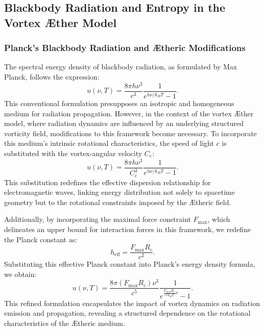 
\subsection{Blackbody Radiation and Entropy in the Vortex \AE{}ther Model}


\subsubsection*{Planck's Blackbody Radiation and \AE{}theric Modifications}
The spectral energy density of blackbody radiation, as formulated by Max Planck, follows the expression:
\begin{equation*}
u(\nu, T) = \frac{8 \pi h \nu^3}{c^3} \frac{1}{e^{h \nu / k_B T} - 1}.
\end{equation*}
This conventional formulation presupposes an isotropic and homogeneous medium for radiation propagation. However, in the context of the vortex \AE{}ther model, where radiation dynamics are influenced by an underlying structured vorticity field, modifications to this framework become necessary. To incorporate this medium’s intrinsic rotational characteristics, the speed of light $c$ is substituted with the vortex-angular velocity $C_e$:
\begin{equation*}
u(\nu, T) = \frac{8 \pi h \nu^3}{C_e^3} \frac{1}{e^{h \nu / k_B T} - 1}.
\end{equation*}
This substitution redefines the effective dispersion relationship for electromagnetic waves, linking energy distribution not solely to spacetime geometry but to the rotational constraints imposed by the \AE{}theric field.


Additionally, by incorporating the maximal force constraint $F_{\max}$, which delineates an upper bound for interaction forces in this framework, we redefine the Planck constant as:
\begin{equation*}
h_\text{eff} = \frac{F_{\max} R_c}{c^2}.
\end{equation*}
Substituting this effective Planck constant into Planck’s energy density formula, we obtain:
\begin{equation*}
u(\nu, T) = \frac{8 \pi \left( F_{\max} R_c \right) \nu^3}{c^5} \frac{1}{e^{\frac{F_{\max} R_c}{c^2 k_B T} \nu} - 1}.
\end{equation*}
This refined formulation encapsulates the impact of vortex dynamics on radiation emission and propagation, revealing a structured dependence on the rotational characteristics of the \AE{}theric medium.


